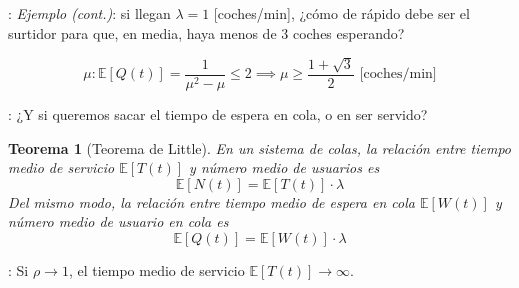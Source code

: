 \documentclass{beamer}
\newtheorem{thm}{Teorema}[section] %
\begin{document}
\begin{frame}{\secname: \subsecname}
    \textit{Ejemplo (cont.)}:
    si llegan $\lambda=1$ [coches/min],
    ¿cómo de rápido debe ser el surtidor
    para que, en media,
    haya menos de 3 coches esperando?

    \begin{equation}
        \mu: \mathbb{E}[Q(t)] = \frac{1}{\mu^2-\mu}\leq 2 \implies \mu\geq \frac{1+\sqrt{3}}{2}\text{ [coches/min]}
    \end{equation}


    \begin{figure}
        
    \end{figure}
\end{frame}






\begin{frame}{\secname: \subsecname}
    ¿Y si queremos sacar el tiempo 
    de espera en cola, o en ser servido?
    \pause

    \begin{thm}[Teorema de Little]
        En un sistema de colas,
        la relación entre tiempo medio
        de servicio $\mathbb{E}[T(t)]$
        y número medio de usuarios es
        \begin{equation}
            \mathbb{E}[N(t)] =
            \mathbb{E}[T(t)]\cdot \lambda
        \end{equation}
        Del mismo modo, la relación
        entre tiempo medio de espera
        en cola $\mathbb{E}[W(t)]$ y
        número medio de usuario en cola es
        \begin{equation}
            \mathbb{E}[Q(t)] =
            \mathbb{E}[W(t)]\cdot \lambda
        \end{equation}
    \end{thm}
\end{frame}



\begin{frame}{\secname: \subsecname}
    Si $\rho\to1$, el tiempo medio de servicio
    $\mathbb{E}[T(t)]\to\infty$.

    \vfill

    \begin{figure}
        
    \end{figure}

\end{frame}
\end{document}
